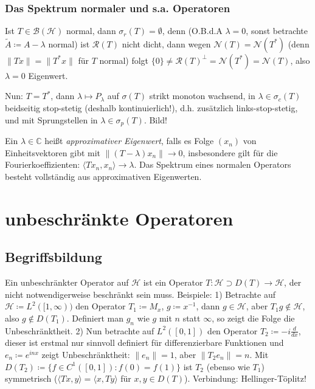 \documentclass[11pt,a4paper]{scrartcl}
\newcommand{\C}{\mathbb{C}} %
\newcommand{\Hc}{\mathcal{H}}
\newcommand{\B}{\mathcal{B}}
\newcommand{\Nc}{\mathcal{N}}
\newcommand{\Rc}{\mathcal{R}}
\theoremstyle{plain}
\theoremstyle{definition}
\theoremstyle{remark}
\begin{document}
\subsubsection{Das Spektrum normaler und s.a. Operatoren}

Ist $T\in \B(\Hc)$ normal, dann $\sigma_r(T)=\emptyset$, denn (O.B.d.A $\lambda=0$, sonst betrachte $\tilde A \coloneqq A-\lambda$ normal) ist $\Rc(T)$ nicht dicht, dann wegen $\Nc(T)=\Nc(T^*)$ (denn $\|Tx\|=\|T^*x\|$ für $T$ normal) folgt $\{0\} \neq \Rc(T)^\bot = \Nc(T^*) = \Nc(T)$, also $\lambda=0$ Eigenwert.

Nun: $T=T^*$, dann $\lambda \mapsto P_\lambda$ auf $\sigma(T)$ strikt monoton wachsend, in $\lambda \in \sigma_c(T)$ beidseitig stop-stetig (deshalb kontinuierlich!), d.h. zusätzlich links-stop-stetig,  und mit Sprungstellen in $\lambda \in \sigma_p(T)$. Bild!

Ein $\lambda\in \C$ heißt \emph{approximativer Eigenwert}, falls es Folge $(x_n)$ von Einheitsvektoren gibt mit $\|(T-\lambda)x_n\| \to 0$, insbesondere gilt für die Fourierkoeffizienten: $\langle Tx_n, x_n \rangle \to \lambda$. Das Spektrum eines normalen Operators besteht vollständig aus approximativen Eigenwerten.

\section{unbeschränkte Operatoren}

\subsection{Begriffsbildung}

Ein unbeschränkter Operator auf $\Hc$ ist ein Operator $T:\Hc \supset D(T) \to \Hc$, der nicht notwendigerweise beschränkt sein muss. Beispiele: 1) Betrachte auf $\Hc\coloneqq L^2([1,\infty))$ den Operator $T_1\coloneqq M_x$, $g\coloneqq x^{-1}$, dann $g\in \Hc$, aber $T_1g\not\in \Hc$, also $g\not\in D(T_1)$. Definiert man $g_n$ wie $g$ mit $n$ statt $\infty$, so zeigt die Folge die Unbeschränktheit.  2) Nun betrachte auf $L^2([0,1])$ den Operator $T_2\coloneqq -i \frac{d}{dx}$, dieser ist erstmal nur sinnvoll definiert für differenzierbare Funktionen und $e_n\coloneqq e^{inx}$ zeigt Unbeschränktheit: $\|e_n\|=1$, aber $\|T_2 e_n\|=n$. Mit $D(T_2)\coloneqq \{f\in C^1([0,1]): f(0)=f(1) \}$ ist $T_2$ (ebenso wie $T_1$) symmetrisch ($\langle Tx,y\rangle = \langle x, Ty \rangle$ für $x,y\in D(T)$). Verbindung: Hellinger-Töplitz!
\end{document}
